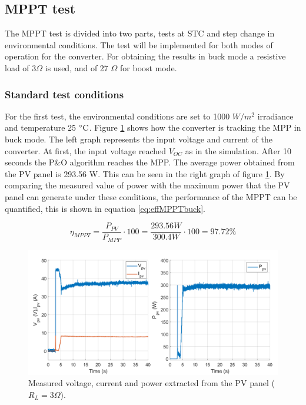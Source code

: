 \subsection{MPPT test}
The MPPT test is divided into two parts, tests at STC and step change in environmental conditions. The test will be implemented for both modes of operation for the converter. For obtaining the results in buck mode a resistive load of 3$\Omega$ is used, and of 27 $\Omega$ for boost mode.

 \subsubsection*{Standard test conditions}
For the first test, the environmental conditions are set to 1000 $W /m^2$ irradiance and temperature 25 $\decC$. Figure \ref{MPPTtestbuckmode1} shows how the converter is tracking the MPP in buck mode. The left graph represents the input voltage and current of the converter. At first, the input voltage reached $V_{OC}$ as in the simulation. After 10 seconds the P\&O algorithm reaches the MPP. The average power obtained from the PV panel is 293.56 W. This can be seen in the right graph of figure \ref{MPPTtestbuckmode1}. By comparing the measured value of power with the maximum power that the PV panel can generate under these conditions, the performance of the MPPT can be quantified, this is shown in equation \ref{eq:effMPPTbuck}.

\begin{equation} \label{eq:effMPPTbuck}
\eta_{MPPT}= \dfrac{P_{PV}}{P_{MPP}} \cdot 100 = \dfrac{293.56W}{300.4W} \cdot 100 = 97.72\%  
\end{equation}


\begin{figure}[H]
	\begin{center}
		\includegraphics[width=1\textwidth]{../Pictures/P1/Test/Buck_mode_MPPT_Vin_Iin_Pin}
		\caption{Measured voltage, current and power extracted from the PV panel ($R_{L}=3\Omega$).}
		\label{MPPTtestbuckmode1}
	\end{center}	
\end{figure}

